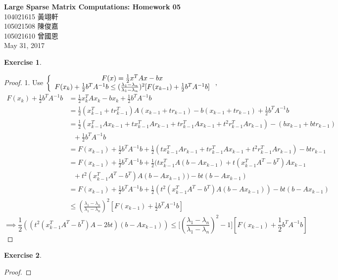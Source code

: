 \documentclass[11pt,a4paper]{article}
\renewcommand{\(}{\left(}
\renewcommand{\)}{\right)}
\renewcommand{\title}{Large Sparse Matrix Computations: Homework 05}
\renewcommand{\author}{104021615 黃翊軒\\105021508	陳俊嘉\\105021610 曾國恩}
\renewcommand{\maketitle}{\begin{center}\textbf{\Large\title}\\[6pt] {\author}\\[6pt] {\color{Gray}\footnotesize May 31, 2017}\end{center}}
\newtheorem{exercise}{Exercise}
\begin{document}
  \maketitle
  
  \setcounter{exercise}{0}


  \begin{exercise}
  \end{exercise}  
  \begin{proof}
  	1. Use $\left\{
  	\begin{array}
  	[c]{c}%
  	F(x)=\frac{1}{2}x^{T}Ax-bx\\
  	F(x_{k})+\frac{1}{2}b^{T}A^{-1}b\leq(\frac{\lambda_{1}-\lambda_{n}}%
  	{\lambda_{1}-\lambda_{n}})^{2}[F(x_{k-1})+\frac{1}{2}b^{T}A^{-1}b]
  	\end{array}
  	\right.  ,$%
  	\begin{align*}
  	F(x_{k})+\frac{1}{2}b^{T}A^{-1}b  & =\frac{1}{2}x_{k}^{T}Ax_{k}-bx_{k}%
  	+\frac{1}{2}b^{T}A^{-1}b\\
  	& =\frac{1}{2}(x_{k-1}^{T}+tr_{k-1}^{T})A(x_{k-1}+tr_{k-1})-b(x_{k-1}%
  	+tr_{k-1})+\frac{1}{2}b^{T}A^{-1}b\\
  	& =\frac{1}{2}(x_{k-1}^{T}Ax_{k-1}+tx_{k-1}^{T}Ar_{k-1}+tr_{k-1}^{T}%
  	Ax_{k-1}+t^{2}r_{k-1}^{T}Ar_{k-1})-(bx_{k-1}+btr_{k-1})\\
  	&\ \ \ 
  	+\frac{1}{2}b^{T}%
  	A^{-1}b\\
  	& =F(x_{k-1})+\frac{1}{2}b^{T}A^{-1}b+\frac{1}{2}(tx_{k-1}^{T}Ar_{k-1}%
  	+tr_{k-1}^{T}Ax_{k-1}+t^{2}r_{k-1}^{T}Ar_{k-1})-btr_{k-1}\\
  	& =F(x_{k-1})+\frac{1}{2}b^{T}A^{-1}b+\frac{1}{2}(tx_{k-1}^{T}A(b-Ax_{k-1}%
  	)+t(x_{k-1}^{T}A^{T}-b^{T})Ax_{k-1}\\
  	&\ \ \ 
  	+t^{2}(x_{k-1}^{T}A^{T}-b^{T}%
  	)A(b-Ax_{k-1}))-bt(b-Ax_{k-1})\\
  	& =F(x_{k-1})+\frac{1}{2}b^{T}A^{-1}b+\frac{1}{2}(t^{2}(x_{k-1}^{T}A^{T}%
  	-b^{T})A(b-Ax_{k-1}))-bt(b-Ax_{k-1})\\
  	& \leq(\frac{\lambda_{1}-\lambda_{n}}{\lambda_{1}-\lambda_{n}})^{2}%
  	[F(x_{k-1})+\frac{1}{2}b^{T}A^{-1}b]
  	\end{align*}%
  	\[
  	\implies\frac{1}{2}((t^{2}(x_{k-1}^{T}A^{T}-b^{T})A-2bt)(b-Ax_{k-1}%
  	))\leq\lbrack(\frac{\lambda_{1}-\lambda_{n}}{\lambda_{1}-\lambda_{n}}%
  	)^{2}-1][F(x_{k-1})+\frac{1}{2}b^{T}A^{-1}b]
  	\]
  \end{proof}


\begin{exercise}
\end{exercise}  
\begin{proof}
	
\end{proof}
\end{document}
